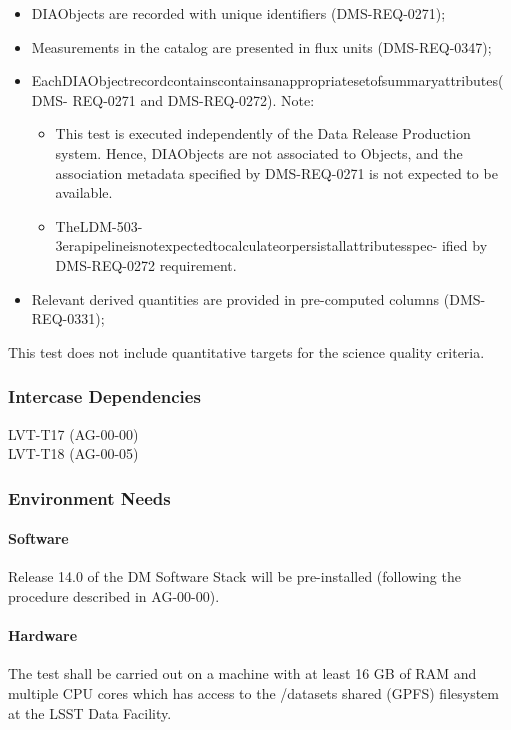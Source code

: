 \begin{itemize}
\tightlist
\item
  DIAObjects are recorded with unique identifiers (DMS-REQ-0271);
\item
  Measurements in the catalog are presented in flux units
  (DMS-REQ-0347);
\item
  EachDIAObjectrecordcontainscontainsanappropriatesetofsummaryattributes(DMS-
  REQ-0271 and DMS-REQ-0272). Note:

  \begin{itemize}
  \tightlist
  \item
    This test is executed independently of the Data Release Production
    system. Hence, DIAObjects are not associated to Objects, and the
    association metadata specified by DMS-REQ-0271 is not expected to be
    available.
  \item
    TheLDM-503-3erapipelineisnotexpectedtocalculateorpersistallattributesspec-
    ified by DMS-REQ-0272 requirement.
  \end{itemize}
\item
  Relevant derived quantities are provided in pre-computed columns
  (DMS-REQ-0331);~
\end{itemize}

This test does not include quantitative targets for the science quality
criteria.



\subsubsection{Intercase Dependencies}
LVT-T17 (AG-00-00)\\
LVT-T18 (AG-00-05)


\subsubsection{Environment Needs}

\paragraph{Software}
Release 14.0 of the DM Software Stack will be pre-installed (following
the procedure described in AG-00-00).


\paragraph{Hardware}
The test shall be carried out on a machine with at least 16 GB of RAM
and multiple CPU cores which has access to the /datasets shared (GPFS)
filesystem at the LSST Data Facility.


